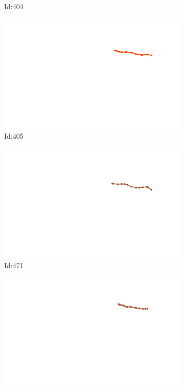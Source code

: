 \documentclass[12pt,twoside]{report}
\begin{document}
\begin{figure}
\begin{subfigure}[b]{0.20\textwidth}
\caption{Id:404}
\end{subfigure}
\begin{subfigure}[b]{0.20\textwidth}
\centering
\includegraphics[width=\textwidth]{../../trajectories/405.png}
\caption{Id:405}
\end{subfigure}
\begin{subfigure}[b]{0.20\textwidth}
\centering
\includegraphics[width=\textwidth]{../../trajectories/471.png}
\caption{Id:471}
\end{subfigure}
\begin{subfigure}[b]{0.20\textwidth}
\centering
\includegraphics[width=\textwidth]{../../trajectories/523.png}

\end{subfigure}
\end{figure}
\end{document}
